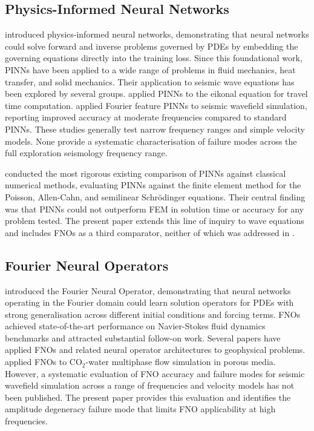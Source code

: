\documentclass[12pt,a4paper]{article}
\begin{document}
\subsection{Physics-Informed Neural Networks}

\citet{raissi2019} introduced physics-informed neural networks,
demonstrating that neural networks could solve forward and inverse
problems governed by PDEs by embedding the governing equations
directly into the training loss. Since this foundational work,
PINNs have been applied to a wide range of problems in fluid
mechanics, heat transfer, and solid mechanics. Their application
to seismic wave equations has been explored by several groups.
\citet{waheed2021} applied PINNs to the eikonal equation for
travel time computation. \citet{alkhalifah2021} applied Fourier
feature PINNs to seismic wavefield simulation, reporting improved
accuracy at moderate frequencies compared to standard PINNs.
These studies generally test narrow frequency ranges and simple
velocity models. None provide a systematic characterisation of
failure modes across the full exploration seismology frequency
range.

\citet{grossmann2024} conducted the most rigorous existing
comparison of PINNs against classical numerical methods,
evaluating PINNs against the finite element method for the
Poisson, Allen-Cahn, and semilinear Schr\"{o}dinger equations.
Their central finding was that PINNs could not outperform FEM in
solution time or accuracy for any problem tested. The present
paper extends this line of inquiry to wave equations and includes
FNOs as a third comparator, neither of which was addressed in
\citet{grossmann2024}.

\subsection{Fourier Neural Operators}

\citet{li2021} introduced the Fourier Neural Operator,
demonstrating that neural networks operating in the Fourier
domain could learn solution operators for PDEs with strong
generalisation across different initial conditions and forcing
terms. FNOs achieved state-of-the-art performance on
Navier-Stokes fluid dynamics benchmarks and attracted substantial
follow-on work. Several papers have applied FNOs and related
neural operator architectures to geophysical problems.
\citet{wen2022} applied FNOs to CO$_2$-water multiphase flow simulation in porous media.
However, a systematic evaluation of FNO accuracy and failure
modes for seismic wavefield simulation across a range of
frequencies and velocity models has not been published. The
present paper provides this evaluation and identifies the
amplitude degeneracy failure mode that limits FNO applicability
at high frequencies.
\end{document}
